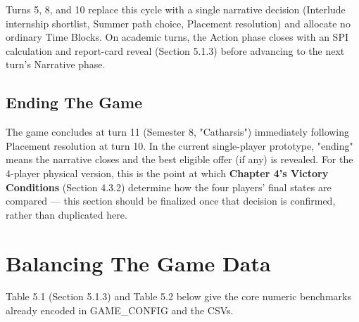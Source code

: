 Turns 5, 8, and 10 replace this cycle with a single narrative decision (Interlude internship shortlist, Summer path choice, Placement resolution) and allocate no ordinary Time Blocks. On academic turns, the Action phase closes with an SPI calculation and report-card reveal (Section 5.1.3) before advancing to the next turn's Narrative phase.

\subsection{Ending The Game}

The game concludes at turn 11 (Semester 8, "Catharsis") immediately following Placement resolution at turn 10. In the current single-player prototype, "ending" means the narrative closes and the best eligible offer (if any) is revealed. For the 4-player physical version, this is the point at which \textbf{Chapter 4's Victory Conditions} (Section 4.3.2) determine how the four players' final states are compared --- this section should be finalized once that decision is confirmed, rather than duplicated here.

\section{Balancing The Game Data}

Table 5.1 (Section 5.1.3) and Table 5.2 below give the core numeric benchmarks already encoded in GAME_CONFIG and the CSVs.


